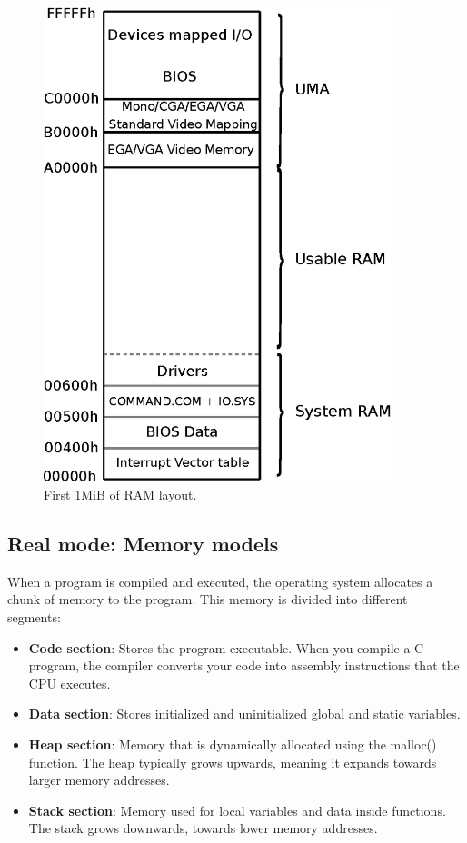 \documentclass[book.tex]{subfiles}
\begin{document}
\par
\begin{figure}[H]
\centering
\includegraphics[width=0.9\textwidth]{imgs/drawings/real_mode_v2.eps}
\caption{First 1MiB of RAM layout.}
\label{fig:fp_internals}
\end{figure}
\pagebreak

\subsection{Real mode: Memory models}
When a program is compiled and executed, the operating system allocates a chunk of memory to the program. This memory is divided into different segments:
\begin{itemize}
  \item \textbf{Code section}: Stores the program executable. When you compile a C program, the compiler converts your code into assembly instructions that the CPU executes.
  \item \textbf{Data section}: Stores initialized and uninitialized global and static variables.
  \item \textbf{Heap section}: Memory that is dynamically allocated using the malloc() function. The heap typically grows upwards, meaning it expands towards larger memory addresses.
  \item \textbf{Stack section}: Memory used for local variables and data inside functions. The stack grows downwards, towards lower memory addresses.
\end{itemize}
\end{document}
